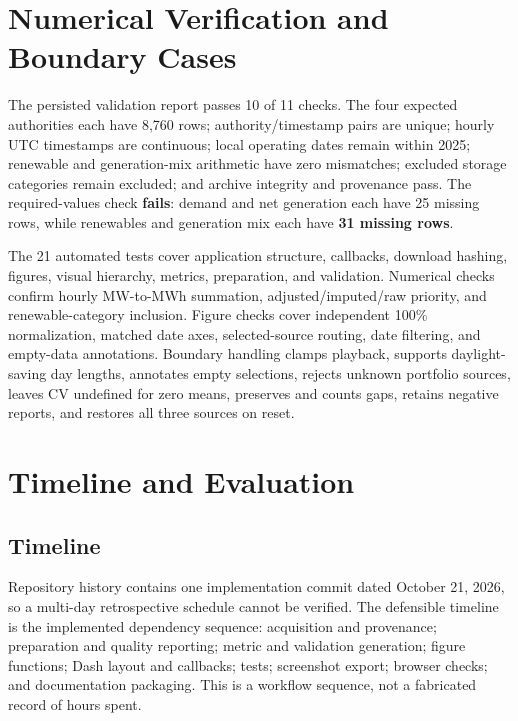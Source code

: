 \documentclass[11pt]{article}
\begin{document}
\section{Numerical Verification and Boundary Cases}
The persisted validation report passes 10 of 11 checks. The four expected authorities each have 8,760 rows; authority/timestamp pairs are unique; hourly UTC timestamps are continuous; local operating dates remain within 2025; renewable and generation-mix arithmetic have zero mismatches; excluded storage categories remain excluded; and archive integrity and provenance pass. The required-values check \textbf{fails}: demand and net generation each have 25 missing rows, while renewables and generation mix each have \textbf{31 missing rows}.

The 21 automated tests cover application structure, callbacks, download hashing, figures, visual hierarchy, metrics, preparation, and validation. Numerical checks confirm hourly MW-to-MWh summation, adjusted/imputed/raw priority, and renewable-category inclusion. Figure checks cover independent 100\% normalization, matched date axes, selected-source routing, date filtering, and empty-data annotations. Boundary handling clamps playback, supports daylight-saving day lengths, annotates empty selections, rejects unknown portfolio sources, leaves CV undefined for zero means, preserves and counts gaps, retains negative reports, and restores all three sources on reset.

\section{Timeline and Evaluation}
\subsection{Timeline}
Repository history contains one implementation commit dated October 21, 2026, so a multi-day retrospective schedule cannot be verified. The defensible timeline is the implemented dependency sequence: acquisition and provenance; preparation and quality reporting; metric and validation generation; figure functions; Dash layout and callbacks; tests; screenshot export; browser checks; and documentation packaging. This is a workflow sequence, not a fabricated record of hours spent.
\end{document}
